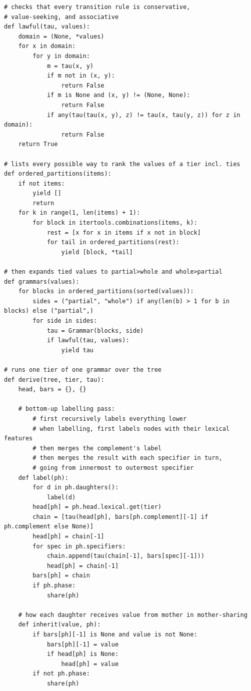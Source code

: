 \begin{verbatim}
# checks that every transition rule is conservative, 
# value-seeking, and associative
def lawful(tau, values):
    domain = (None, *values)
    for x in domain:
        for y in domain:
            m = tau(x, y)
            if m not in (x, y):
                return False
            if m is None and (x, y) != (None, None):
                return False
            if any(tau(tau(x, y), z) != tau(x, tau(y, z)) for z in domain):
                return False
    return True

# lists every possible way to rank the values of a tier incl. ties
def ordered_partitions(items):
    if not items:
        yield []
        return
    for k in range(1, len(items) + 1):
        for block in itertools.combinations(items, k):
            rest = [x for x in items if x not in block]
            for tail in ordered_partitions(rest):
                yield [block, *tail]

# then expands tied values to partial>whole and whole>partial
def grammars(values):
    for blocks in ordered_partitions(sorted(values)):
        sides = ("partial", "whole") if any(len(b) > 1 for b in blocks) else ("partial",)
        for side in sides:
            tau = Grammar(blocks, side)
            if lawful(tau, values):
                yield tau

# runs one tier of one grammar over the tree
def derive(tree, tier, tau):
    head, bars = {}, {}

    # bottom-up labelling pass:
        # first recursively labels everything lower
        # when labelling, first labels nodes with their lexical features
        # then merges the complement's label
        # then merges the result with each specifier in turn,
        # going from innermost to outermost specifier
    def label(ph):
        for d in ph.daughters():
            label(d)
        head[ph] = ph.head.lexical.get(tier)
        chain = [tau(head[ph], bars[ph.complement][-1] if ph.complement else None)]
        head[ph] = chain[-1]
        for spec in ph.specifiers:
            chain.append(tau(chain[-1], bars[spec][-1]))
            head[ph] = chain[-1]
        bars[ph] = chain
        if ph.phase:
            share(ph)

    # how each daughter receives value from mother in mother-sharing
    def inherit(value, ph):
        if bars[ph][-1] is None and value is not None:
            bars[ph][-1] = value
            if head[ph] is None:
                head[ph] = value
        if not ph.phase:
            share(ph)


\end{verbatim}
